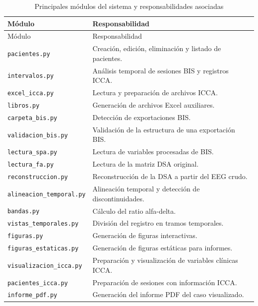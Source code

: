 \documentclass[
  spanish,
  a4paper,
  12pt,
  twoside]{memoir}
\begin{document}
\begin{longtable}[]{@{}
  >{\raggedright\arraybackslash}p{}
  >{\raggedright\arraybackslash}p{}@{}}
\caption{Principales módulos del sistema y responsabilidades
asociadas}\label{tbl-modulos-sistema}\tabularnewline
\toprule\noalign{}
\begin{minipage}[b]{\linewidth}\raggedright
Módulo
\end{minipage} & \begin{minipage}[b]{\linewidth}\raggedright
Responsabilidad
\end{minipage} \\
\midrule\noalign{}
\endfirsthead
\toprule\noalign{}
\begin{minipage}[b]{\linewidth}\raggedright
Módulo
\end{minipage} & \begin{minipage}[b]{\linewidth}\raggedright
Responsabilidad
\end{minipage} \\
\midrule\noalign{}
\endhead
\bottomrule\noalign{}
\endlastfoot
\texttt{pacientes.py} & Creación, edición, eliminación y listado de
pacientes. \\
\texttt{intervalos.py} & Análisis temporal de sesiones BIS y registros
ICCA. \\
\texttt{excel\_icca.py} & Lectura y preparación de archivos ICCA. \\
\texttt{libros.py} & Generación de archivos Excel auxiliares. \\
\texttt{carpeta\_bis.py} & Detección de exportaciones BIS. \\
\texttt{validacion\_bis.py} & Validación de la estructura de una
exportación BIS. \\
\texttt{lectura\_spa.py} & Lectura de variables procesadas de BIS. \\
\texttt{lectura\_fa.py} & Lectura de la matriz DSA original. \\
\texttt{reconstruccion.py} & Reconstrucción de la DSA a partir del EEG
crudo. \\
\texttt{alineacion\_temporal.py} & Alineación temporal y detección de
discontinuidades. \\
\texttt{bandas.py} & Cálculo del ratio alfa-delta. \\
\texttt{vistas\_temporales.py} & División del registro en tramos
temporales. \\
\texttt{figuras.py} & Generación de figuras interactivas. \\
\texttt{figuras\_estaticas.py} & Generación de figuras estáticas para
informes. \\
\texttt{visualizacion\_icca.py} & Preparación y visualización de
variables clínicas ICCA. \\
\texttt{pacientes\_icca.py} & Preparación de sesiones con información
ICCA. \\
\texttt{informe\_pdf.py} & Generación del informe PDF del caso
visualizado. \\
\end{longtable}
\end{document}
